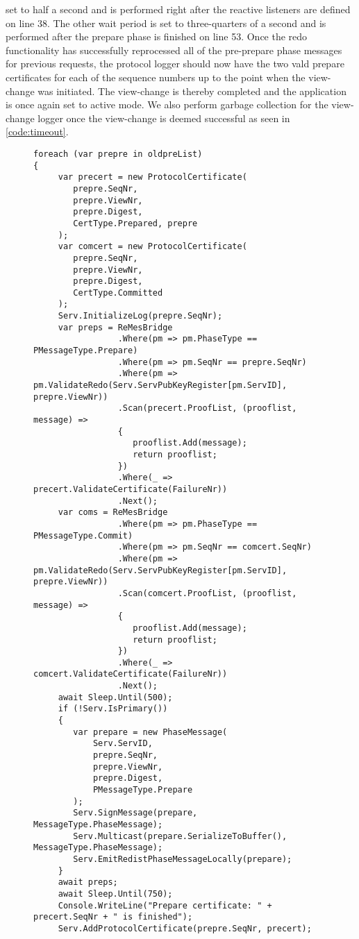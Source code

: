 set to half a second and is performed right after the reactive listeners are defined on line 38. The other wait period is set to three-quarters of a second and is performed after the prepare phase is finished on line 53. Once the redo functionality has successfully reprocessed all of the pre-prepare phase messages for previous requests, the protocol logger should now have the two vald prepare certificates for each of the sequence numbers up to the point when the view-change was initiated. The view-change is thereby completed and the application is once again set to active mode. We also perform garbage collection for the view-change logger once the view-change is deemed successful as seen in \autoref{code:timeout}.

\begin{figure}[H]
	\centering
	\begin{lstlisting}[label = code:redoprotocol, caption=Redo Protocol Functionality, captionpos = b, basicstyle=\scriptsize]
foreach (var prepre in oldpreList)
{
     var precert = new ProtocolCertificate(
	    prepre.SeqNr, 
	    prepre.ViewNr, 
	    prepre.Digest, 
	    CertType.Prepared, prepre
     );
     var comcert = new ProtocolCertificate(
        prepre.SeqNr, 
        prepre.ViewNr, 
        prepre.Digest, 
        CertType.Committed
     );
     Serv.InitializeLog(prepre.SeqNr);
     var preps = ReMesBridge
     	         .Where(pm => pm.PhaseType == PMessageType.Prepare)
                 .Where(pm => pm.SeqNr == prepre.SeqNr)
                 .Where(pm => pm.ValidateRedo(Serv.ServPubKeyRegister[pm.ServID], prepre.ViewNr))
                 .Scan(precert.ProofList, (prooflist, message) =>
                 {
                    prooflist.Add(message);
                    return prooflist;
                 })
                 .Where(_ => precert.ValidateCertificate(FailureNr))
                 .Next();
     var coms = ReMesBridge
                 .Where(pm => pm.PhaseType == PMessageType.Commit)
                 .Where(pm => pm.SeqNr == comcert.SeqNr)
                 .Where(pm => pm.ValidateRedo(Serv.ServPubKeyRegister[pm.ServID], prepre.ViewNr))
                 .Scan(comcert.ProofList, (prooflist, message) =>
                 {
                    prooflist.Add(message);
                    return prooflist;
                 })
                 .Where(_ => comcert.ValidateCertificate(FailureNr))
                 .Next();
     await Sleep.Until(500);              
     if (!Serv.IsPrimary())
     {
        var prepare = new PhaseMessage(
            Serv.ServID, 
            prepre.SeqNr, 
            prepre.ViewNr, 
            prepre.Digest, 
            PMessageType.Prepare
        );
        Serv.SignMessage(prepare, MessageType.PhaseMessage);
        Serv.Multicast(prepare.SerializeToBuffer(), MessageType.PhaseMessage);
        Serv.EmitRedistPhaseMessageLocally(prepare);
     }
     await preps;
     await Sleep.Until(750);
     Console.WriteLine("Prepare certificate: " + precert.SeqNr + " is finished");
     Serv.AddProtocolCertificate(prepre.SeqNr, precert);


\end{lstlisting}
\end{figure}

